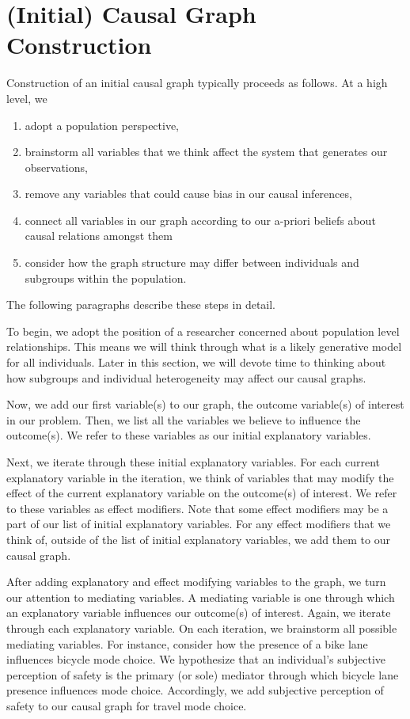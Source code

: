 \section{(Initial) Causal Graph Construction}
\label{sec:graph-construction}

Construction of an initial causal graph typically proceeds as follows.
At a high level, we
\begin{enumerate}
   \item adopt a population perspective,
   \item brainstorm all variables that we think affect the system that generates our observations,
   \item remove any variables that could cause bias in our causal inferences,
   \item connect all variables in our graph according to our a-priori beliefs about causal relations amongst them
   \item consider how the graph structure may differ between individuals and subgroups within the population.
\end{enumerate}
The following paragraphs describe these steps in detail.

To begin, we adopt the position of a researcher concerned about population level relationships.
This means we will think through what is a likely generative model for all individuals.
Later in this section, we will devote time to thinking about how subgroups and individual heterogeneity may affect our causal graphs.

Now, we add our first variable(s) to our graph, the outcome variable(s) of interest in our problem.
Then, we list all the variables we believe to influence the outcome(s).
We refer to these variables as our initial explanatory variables.

Next, we iterate through these initial explanatory variables.
For each current explanatory variable in the iteration, we think of variables that may modify the effect of the current explanatory variable on the outcome(s) of interest.
We refer to these variables as effect modifiers.
Note that some effect modifiers may be a part of our list of initial explanatory variables.
For any effect modifiers that we think of, outside of the list of initial explanatory variables, we add them to our causal graph.

After adding explanatory and effect modifying variables to the graph, we turn our attention to mediating variables.
A mediating variable is one through which an explanatory variable influences our outcome(s) of interest.
Again, we iterate through each explanatory variable.
On each iteration, we brainstorm all possible mediating variables.
For instance, consider how the presence of a bike lane influences bicycle mode choice.
We hypothesize that an individual's subjective perception of safety is the primary (or sole) mediator through which bicycle lane presence influences mode choice.
Accordingly, we add subjective perception of safety to our causal graph for travel mode choice.

